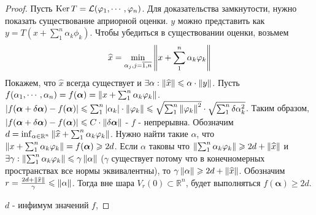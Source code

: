 \begin{proof}
    Пусть $\operatorname{Ker} T =\mathcal{L}(\varphi_1, \cdots, \varphi_n)$. Для доказательства замкнутости, нужно показать существование априорной оценки. 
    $y$ можно представить как $y = T\left( x +\sum_{1}^{n}\alpha_k \phi_k \right)$. Чтобы убедиться в существовании оценки, возьмем 
    \begin{gather}
    \widehat{x} = \min_{\alpha_j, j=\overline{1,n}}\left\|x + \sum_{1}^{n}\alpha_k \varphi_k\right\|
    \end{gather}
    Покажем, что $\widehat{x}$ всегда существует и $\exists \alpha: \left\|\widehat{x}\right\|\leqslant\alpha\cdot\left\|y\right\|$.
    Пусть $f(\alpha_1, \cdots, \alpha_n) = f(\boldsymbol{\alpha}) = \left\|x + \sum_{1}^{n}\alpha_k \varphi_k\right\|$.
    $\left|f(\boldsymbol{\alpha} + \delta\boldsymbol{\alpha}) - f(\boldsymbol{\alpha})\right| \leqslant \sum_{1}^{n}\left|\alpha_k\right| \cdot\left\|\varphi_k\right\|
    \leqslant \sqrt{\sum_{1}^{n}\left\|\varphi_k\right\|^2}\cdot\sqrt{\sum_{1}^{n}\delta\alpha_k^2}$.
    Таким образом, $\left|f(\boldsymbol{\alpha} + \delta\boldsymbol{\alpha}) - f(\boldsymbol{\alpha})\right| \leqslant C \cdot \left\|\delta\boldsymbol{\alpha}\right\|$ - $f$ - непрерывна. 
    Обозначим $d = \inf_{\alpha \in \mathbb{R}^n}\left\|\widehat{x} + \sum_{1}^{n}\alpha_k\varphi_k\right\|$. 
    Нужно найти такие $\alpha$, что $\left\|x + \sum_{1}^{n}\alpha_k \varphi_k\right\| = f(\boldsymbol{\alpha}) \geqslant 2d$. 
    Если $\alpha$ таковы что $\left\|\sum_{1}^{n}\alpha_k\varphi_k\right\|\geqslant 2d + \left\|\widehat{x}\right\|$ и $\exists \gamma : \left\|\sum_{1}^{n}\alpha_k\varphi_k\right\|\leqslant
    \gamma\left\|\alpha\right\|$ ($\gamma$ существует потому что в конечномерных пространствах все нормы эквивалентны), то $\gamma\left\|\alpha\right\| \geqslant 2d + \left\|\widehat{x}\right\|$.
    Обозначим $r = \frac{2d + \left\|\widehat{x}\right\|}{\gamma} \leqslant \left\|\alpha\right\|$. Тогда вне шара $V_r(0) \subset \mathbb{R}^n$, 
    будет выполняться $f(\boldsymbol{\alpha}) \geqslant 2d$.

    $d$ - инфимум значений $f$, 
\end{proof}
